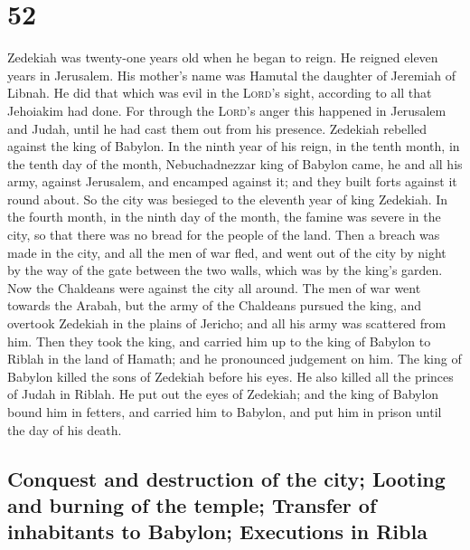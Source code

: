 \hypertarget{section-51}{%
\section{52}\label{section-51}}

 Zedekiah was twenty-one years old when he began to reign.
He reigned eleven years in Jerusalem. His mother's name was Hamutal the
daughter of Jeremiah of Libnah.  He did that which was
evil in the \textsc{Lord}'s sight, according to all that Jehoiakim had
done.  For through the \textsc{Lord}'s anger this happened
in Jerusalem and Judah, until he had cast them out from his presence.
Zedekiah rebelled against the king of Babylon.  In the
ninth year of his reign, in the tenth month, in the tenth day of the
month, Nebuchadnezzar king of Babylon came, he and all his army, against
Jerusalem, and encamped against it; and they built forts against it
round about.  So the city was besieged to the eleventh
year of king Zedekiah.  In the fourth month, in the ninth
day of the month, the famine was severe in the city, so that there was
no bread for the people of the land.  Then a breach was
made in the city, and all the men of war fled, and went out of the city
by night by the way of the gate between the two walls, which was by the
king's garden. Now the Chaldeans were against the city all around. The
men of war went towards the Arabah,  but the army of the
Chaldeans pursued the king, and overtook Zedekiah in the plains of
Jericho; and all his army was scattered from him.  Then
they took the king, and carried him up to the king of Babylon to Riblah
in the land of Hamath; and he pronounced judgement on him.
 The king of Babylon killed the sons of Zedekiah before
his eyes. He also killed all the princes of Judah in Riblah.
 He put out the eyes of Zedekiah; and the king of Babylon
bound him in fetters, and carried him to Babylon, and put him in prison
until the day of his death.

\hypertarget{conquest-and-destruction-of-the-city-looting-and-burning-of-the-temple-transfer-of-inhabitants-to-babylon-executions-in-ribla}{%
\subsection{Conquest and destruction of the city; Looting and burning of
the temple; Transfer of inhabitants to Babylon; Executions in
Ribla}\label{conquest-and-destruction-of-the-city-looting-and-burning-of-the-temple-transfer-of-inhabitants-to-babylon-executions-in-ribla}}

